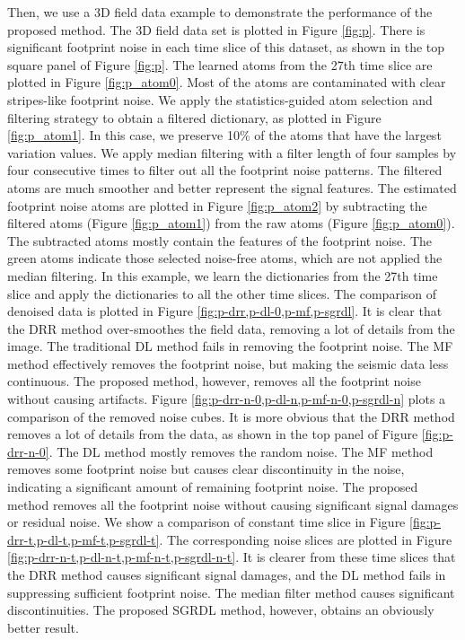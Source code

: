 Then, we use a 3D field data example to demonstrate the performance of the proposed method. The 3D field data set is plotted in Figure \ref{fig:p}.  There is significant footprint noise in each time slice of this dataset, as shown in the top square panel of Figure \ref{fig:p}. The learned atoms from the 27th time slice are plotted in Figure \ref{fig:p_atom0}. Most of the atoms are contaminated with clear stripes-like footprint noise. We apply the statistics-guided atom selection and filtering strategy to obtain a filtered dictionary, as plotted in Figure \ref{fig:p_atom1}. In this case, we preserve 10\% of the atoms that have the largest variation values. We apply median filtering with a filter length of four samples by four consecutive times to filter out all the footprint noise patterns. The filtered atoms are much smoother and better represent the signal features. The estimated footprint noise atoms are plotted in Figure \ref{fig:p_atom2} by subtracting the filtered atoms (Figure \ref{fig:p_atom1}) from the raw atoms (Figure \ref{fig:p_atom0}). The subtracted atoms mostly contain the features of the footprint noise. The green atoms indicate those selected noise-free atoms, which are not applied the median filtering. In this example, we learn the dictionaries from the 27th time slice and apply the dictionaries to all the other time slices. The comparison of denoised data is plotted in Figure \ref{fig:p-drr,p-dl-0,p-mf,p-sgrdl}. It is clear that the DRR method over-smoothes the field data, removing a lot of details from the image. The traditional DL method fails in removing the footprint noise. The MF method effectively removes the footprint noise, but making the seismic data less continuous. The proposed method, however, removes all the footprint noise without causing artifacts.  Figure \ref{fig:p-drr-n-0,p-dl-n,p-mf-n-0,p-sgrdl-n} plots a comparison of the removed noise cubes. It is more obvious that the DRR method removes a lot of details from the data, as shown in the top panel of Figure \ref{fig:p-drr-n-0}. The DL method mostly removes the random noise. The MF method removes some footprint noise but causes clear discontinuity in the noise, indicating a significant amount of remaining footprint noise. The proposed method removes all the footprint noise without causing significant signal damages or residual noise. We show a comparison of constant time slice in Figure \ref{fig:p-drr-t,p-dl-t,p-mf-t,p-sgrdl-t}. The corresponding noise slices are plotted in Figure \ref{fig:p-drr-n-t,p-dl-n-t,p-mf-n-t,p-sgrdl-n-t}. It is clearer from these time slices that the DRR method causes significant signal damages, and the DL method fails in suppressing sufficient footprint noise. The median filter method causes significant discontinuities. The proposed SGRDL method, however, obtains an obviously better result.
 
